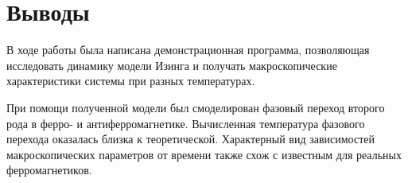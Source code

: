 \documentclass[12pt,a4paper]{article}
\begin{document}

    \section{Выводы}

        В ходе работы была написана демонстрационная программа, позволяющая исследовать динамику модели Изинга и получать макроскопические характеристики системы при разных температурах.

        При помощи полученной модели был смоделирован фазовый переход второго рода в ферро- и антиферромагнетике. Вычисленная температура фазового перехода оказалась близка к теоретической. Характерный вид зависимостей макроскопических параметров от времени также схож с известным для реальных ферромагнетиков.

    \clearpage


    \nocite{*}
    
    
\end{document}
